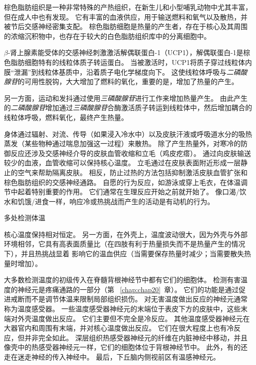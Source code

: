 \begin{proposition} \label{box:41_1}
	
	\quad \quad 棕色脂肪组织是一种非常特殊的产热组织，在新生儿和小型哺乳动物中尤其丰富，但在成人中也有发现。
	它有丰富的血液供应，用于输送燃料和氧气以及散热，并被节后交感神经密集支配。
	棕色脂肪细胞是热量的产生者，存在于核心及其周围的浓缩沉积物中，也存在于较大的白色脂肪组织库中的分离细胞中。
	
	\quad \quad $\beta$-肾上腺素能受体的交感神经刺激激活解偶联蛋白-1（UCP1），解偶联蛋白-1是棕色脂肪细胞特有的线粒体质子转运蛋白。
	当被激活时，UCP1将质子穿过线粒体内膜“泄漏”到线粒体基质中，沿着质子电化学梯度向下。
	这使线粒体呼吸与\textit{二磷酸腺苷}的可用性脱钩，大大增加了燃料的氧化，重要的是，增加了热量的产生。
	
	\quad \quad 另一方面，运动和发抖通过使用\textit{三磷酸腺苷}进行工作来增加热量产生。
	由此产生的\textit{二磷酸腺苷}增加通过\textit{三磷酸腺苷}合酶激活质子转运到线粒体中，然后增加耦合的线粒体呼吸，燃料氧化，最终产生热量。
	
\end{proposition}


身体通过辐射、对流、传导（如果浸入冷水中）以及皮肤汗液或呼吸道水分的吸热蒸发（某些物种通过喘息加强这一过程）来散热。
除了产生热量外，对寒冷的防御反应还涉及交感神经介导的皮肤血管收缩和立毛（鸡皮疙瘩）。
通过向皮肤输送较少的血液，血管收缩可以保持核心温度。
立毛通过在皮肤表面附近形成一层静止的空气来帮助隔离皮肤。
相反，防止过热的方法包括抑制激活皮肤血管扩张和棕色脂肪组织的交感神经通路。
自愿的行为反应，如游泳或穿上毛衣，在体温调节中起着特别重要的作用。
它们通常在生理反应开始之前就开始了。
像口渴/饮水和饥饿/进食一样，响应冷或热挑战而产生的活动是有动机的行为。


多处检测体温

核心温度保持相对恒定。
另一方面，在外壳上，温度波动很大，因为外壳与外部环境相邻，它具有高表面质量比（在四肢有利于热量损失而不是热量产生的情况下），并且热挑战显着 影响它的温血供应（当需要保存热量时减少；当需要散失热量时增加）。


大多数检测温度的初级传入在脊髓背根神经节中都有它们的细胞体。
检测有害温度的神经元是疼痛通路的一部分（第 ~\ref{chap:chap20}~章）。
它们的功能是通过促进戒断而不是调节体温来限制局部组织损伤。
对无害温度做出反应的神经元通常称为温度感受器。
一些温度感受器神经元的末端位于表皮下方的皮肤中，这些末端对外壳温度做出反应。
它们主要但不完全是冷反应。 其他温度感受器神经元在大器官内和周围有末端，并对核心温度做出反应。
它们在很大程度上也有冷反应，但并非完全如此。
深层组织热感受器神经元的纤维在内脏神经中移动，并且像壳中的热感受器神经元一样，它们的细胞体位于背根神经节中。
此外，有的还走在迷走神经的传入神经中。 最后，下丘脑内侧视前区有温感神经元。


